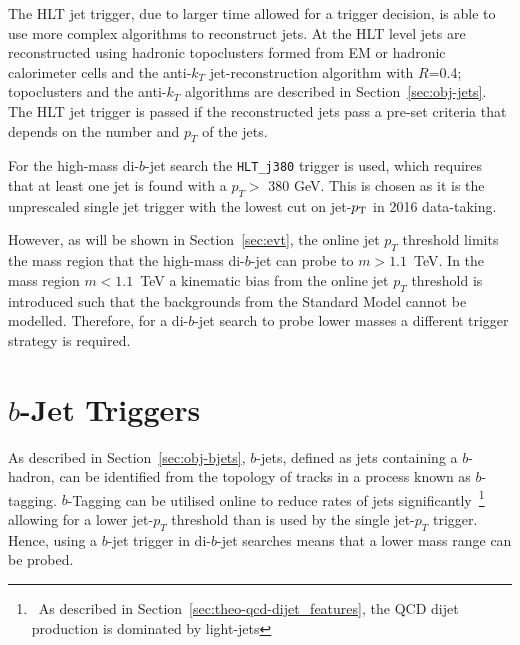 The HLT jet trigger, due to larger time allowed for a trigger decision,
is able to use more complex algorithms to reconstruct jets.
At the HLT level jets are reconstructed using hadronic topoclusters formed from EM or hadronic calorimeter cells and the anti-$k_T$ jet-reconstruction algorithm with $R$=0.4;
topoclusters and the anti-$k_T$ algorithms are described in Section~\ref{sec:obj-jets}.
The HLT jet trigger is passed if the reconstructed jets pass a pre-set criteria that depends on the number and $p_T$ of the jets.


For the high-mass di-$b$-jet search the \verb|HLT_j380| trigger is used, which requires that at least one jet is found with a $p_T >$ 380 GeV.
This is chosen as it is the unprescaled single jet trigger with the lowest cut on jet-$p_{\mathrm{T}}$ in 2016 data-taking.

However, as will be shown in Section~\ref{sec:evt},
the online jet $p_T$ threshold limits the mass region that the high-mass di-$b$-jet can probe to $m > 1.1$~TeV.
In the mass region $m < 1.1$~TeV a kinematic bias from the online jet $p_T$ threshold is introduced
such that the backgrounds from the Standard Model cannot be modelled. 
Therefore, for a di-$b$-jet search to probe lower masses a different trigger strategy is required.

\section{$b$-Jet Triggers}
\label{sec:trig-bjet}

As described in Section~\ref{sec:obj-bjets}, $b$-jets, defined as jets containing a $b$-hadron,
can be identified from the topology of tracks in a process known as $b$-tagging.
$b$-Tagging can be utilised online to reduce rates of jets significantly~\footnote{\ As described in Section~\ref{sec:theo-qcd-dijet_features},
  the QCD dijet production is dominated by light-jets}
allowing for a lower jet-$p_T$ threshold than is used by the single jet-$p_T$ trigger.
Hence, using a $b$-jet trigger in di-$b$-jet searches means that a lower mass range can be probed.

